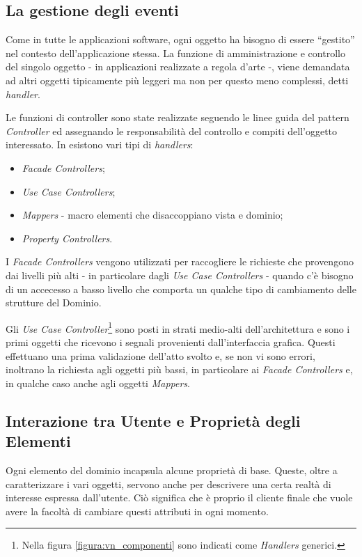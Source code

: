 \subsection{La gestione degli eventi}
Come in tutte le applicazioni software, ogni oggetto ha bisogno di essere ``gestito'' nel contesto dell'applicazione stessa.
La funzione di amministrazione e controllo del singolo oggetto - in applicazioni realizzate a regola d'arte -, viene demandata ad altri oggetti tipicamente più leggeri ma non per questo meno complessi, detti \emph{handler}.

Le funzioni di controller sono state realizzate seguendo le linee guida del pattern \emph{Controller}\cite{AUPL04} ed assegnando le responsabilità del controllo e compiti dell'oggetto interessato. In \visualnetkit{} esistono vari tipi di \emph{handlers}:
\begin{itemize}
\item \emph{Facade Controllers};
\item \emph{Use Case Controllers};
\item \emph{Mappers} - macro elementi che disaccoppiano vista e dominio;
\item \emph{Property Controllers}.
\end{itemize}

I \emph{Facade Controllers} vengono utilizzati per raccogliere le richieste che provengono dai livelli più alti - in particolare dagli \emph{Use Case Controllers} - quando c'è bisogno di un accecesso a basso livello che comporta un qualche tipo di cambiamento delle strutture del Dominio.

Gli \emph{Use Case Controller}\footnote{Nella figura \ref{figura:vn_componenti} sono indicati come \emph{Handlers} generici.} sono posti in strati medio-alti dell'architettura e sono i primi oggetti che ricevono i segnali provenienti dall'interfaccia grafica. Questi effettuano una prima validazione dell'atto svolto e, se non vi sono errori, inoltrano la richiesta agli oggetti più bassi, in particolare ai \emph{Facade Controllers} e, in qualche caso anche agli oggetti \emph{Mappers}.


\subsection{Interazione tra Utente e Proprietà degli Elementi}
Ogni elemento del dominio incapsula alcune proprietà di base. Queste, oltre a caratterizzare i vari oggetti, servono anche per descrivere una certa realtà di interesse espressa dall'utente. Ciò significa che è proprio il cliente finale che vuole avere la facoltà di cambiare questi attributi in ogni momento.

